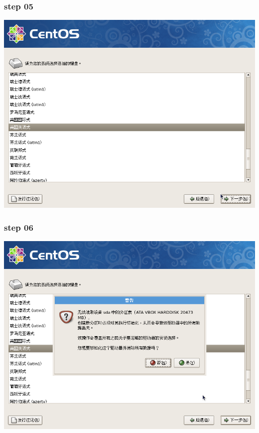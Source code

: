 \documentclass[xcolor=svgnames,presentation]{beamer}
\begin{document}
\begin{frame}
\frametitle{step 05}
\label{sec-2-5}

\begin{center}
\includegraphics[width=.9\linewidth]{img/img10.png}
\end{center}
\end{frame}
\begin{frame}
\frametitle{step 06}
\label{sec-2-6}

\begin{center}
\includegraphics[width=.9\linewidth]{img/img11.png}
\end{center}
\end{frame}
\end{document}
